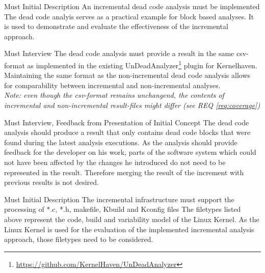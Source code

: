 \documentclass[a4paper]{article}
\begin{document}
\begin{req} \label{req:dead-code-analysis}
\reqtable
	{Must}  {Initial Description}
	{An incremental dead code analysis must be implemented}
	{The dead code analyis serves as a practical example for block based analyses. It is used to demonstrate and evaluate the effectiveness of the incremental approach.}
	\vspace{1em}
	\begin{subreq} \label{req:format}
    \reqtable
    {Must}  {Interview}
	{The dead code analysis must provide a result in the same csv-format as implemented in the existing UnDeadAnalyzer\footnote{\url{https://github.com/KernelHaven/UnDeadAnalyzer}} plugin for Kernelhaven.}
	{Maintaining the same format as the non-incremental dead code analysis allows for comparability between incremental and non-incremental analyses. \\
	\emph{Note: even though the csv-format remains unchangend, the contents of incremental and non-incremental result-files might differ (see REQ \ref{req:coverage})}}
	\end{subreq}
	\vspace{1em}
	\begin{subreq} \label{req:coverage}
    \reqtable
    {Must}  {Interview, Feedback from Presentation of Initial Concept}
	{The dead code analysis should produce a result that only contains dead code blocks that were found during the latest analysis executions.}
	{As the analysis should provide feedback for the developer on his work, parts of the software system which could not have been affected by the changes he introduced do not need to be represented in the result. Therefore merging the result of the increment with previous results is not desired.}
	\end{subreq}
\end{req}
\vspace{1em}

\begin{req} \label{req:target-artifacts}
\reqtable
    {Must}  {Initial Description}
	{The incremental infrastructure must support the processing of *.c, *.h, makefile, Kbuild and Kconfig files}
	{The filetypes listed above represent the code, build and variability model of the Linux Kernel. As the Linux Kernel is used for the evaluation of the implemented incremental analysis approach, those filetypes need to be considered.}
\end{req}
\end{document}
